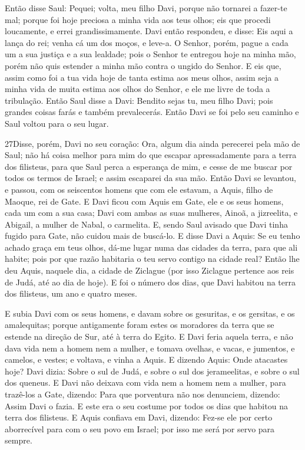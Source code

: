 Então disse Saul: Pequei; volta, meu filho Davi, porque não
tornarei a fazer-te mal; porque foi hoje preciosa a minha vida aos
teus olhos; eis que procedi loucamente, e errei grandissimamente.
Davi então respondeu, e disse: Eis aqui a lança do rei; venha
cá um dos moços, e leve-a. O Senhor, porém, pague a cada um a
sua justiça e a sua lealdade; pois o Senhor te entregou hoje na
minha mão, porém não quis estender a minha mão contra o ungido do
Senhor. E eis que, assim como foi a tua vida hoje de tanta
estima aos meus olhos, assim seja a minha vida de muita estima aos
olhos do Senhor, e ele me livre de toda a tribulação. Então
Saul disse a Davi: Bendito sejas tu, meu filho Davi; pois grandes
coisas farás e também prevalecerás. Então Davi se foi pelo seu
caminho e Saul voltou para o seu lugar.

\medskip

\lettrine{27} Disse, porém, Davi no seu coração: Ora, algum
dia ainda perecerei pela mão de Saul; não há coisa melhor para mim
do que escapar apressadamente para a terra dos filisteus, para que
Saul perca a esperança de mim, e cesse de me buscar por todos os
termos de Israel; e assim escaparei da sua mão. Então Davi se
levantou, e passou, com os seiscentos homens que com ele estavam, a
Aquis, filho de Maoque, rei de Gate. E Davi ficou com Aquis em
Gate, ele e os seus homens, cada um com a sua casa; Davi com ambas
as suas mulheres, Ainoã, a jizreelita, e Abigail, a mulher de Nabal,
o carmelita. E, sendo Saul avisado que Davi tinha fugido para
Gate, não cuidou mais de buscá-lo. E disse Davi a Aquis: Se eu
tenho achado graça em teus olhos, dá-me lugar numa das cidades da
terra, para que ali habite; pois por que razão habitaria o teu servo
contigo na cidade real? Então lhe deu Aquis, naquele dia, a
cidade de Ziclague (por isso Ziclague pertence aos reis de Judá, até
ao dia de hoje). E foi o número dos dias, que Davi habitou na
terra dos filisteus, um ano e quatro meses.

E subia Davi com os seus homens, e davam sobre os gesuritas, e os
gersitas, e os amalequitas; porque antigamente foram estes os
moradores da terra que se estende na direção de Sur, até à terra do
Egito. E Davi feria aquela terra, e não dava vida nem a homem
nem a mulher, e tomava ovelhas, e vacas, e jumentos, e camelos, e
vestes; e voltava, e vinha a Aquis. E dizendo Aquis: Onde
atacastes hoje? Davi dizia: Sobre o sul de Judá, e sobre o sul dos
jerameelitas, e sobre o sul dos queneus. E Davi não deixava
com vida nem a homem nem a mulher, para trazê-los a Gate, dizendo:
Para que porventura não nos denunciem, dizendo: Assim Davi o fazia.
E este era o seu costume por todos os dias que habitou na terra dos
filisteus. E Aquis confiava em Davi, dizendo: Fez-se ele por
certo aborrecível para com o seu povo em Israel; por isso me será
por servo para sempre.

